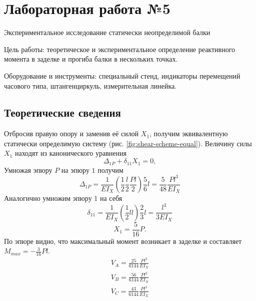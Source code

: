 \section{Лабораторная работа №5}
Экспериментальное исследование статически неопределимой балки

Цель работы: теоретическое и экспериментальное определение реактивного момента в заделке и прогиба балки в нескольких точках.

Оборудование и инструменты: специальный стенд, индикаторы перемещений часового типа, штангенциркуль, измерительная линейка.

\subsection{Теоретические сведения}
Отбросив правую опору и заменив её силой $ X_1 $, получим эквивалентную статически определимую систему (рис. \ref{fig:shear-scheme-equal}).
Величину силы $ X_1 $ находят из канонического уравнения \[ \Delta_{1P} + \delta_{11} X_1 = 0, \]
Умножая эпюру $ P $ на эпюру $ 1 $ получим
\begin{equation}
    \Delta_{1P} = \frac{1}{EI_X} \left(\frac{1}{2} \frac{l}{2} \frac{Pl}{2}\right) \frac{5}{6} l = \frac{5}{48} \frac{Pl^3}{EI_X}
\end{equation}
Аналогично умножим эпюру 1 на себя
\begin{equation}
    \delta_{11} = \frac{1}{EI_X} \left(\frac{1}{2}ll\right) \frac{2}{3}l = \frac{l^3}{3EI_X}
\end{equation}
\begin{equation}
    X_1 = \frac{5}{16}P.
\end{equation}
По эпюре видно, что максимальный момент возникает в заделке и составляет $ M_{max} = -\frac{3}{16}Pl $.
\begin{align*}
    V_A = \frac{25}{6144}\frac{Pl^3}{EI_X} \\
    V_B = \frac{56}{6144}\frac{Pl^3}{EI_X} \\
    V_C = \frac{43}{6144}\frac{Pl^3}{EI_X} \\
\end{align*}

